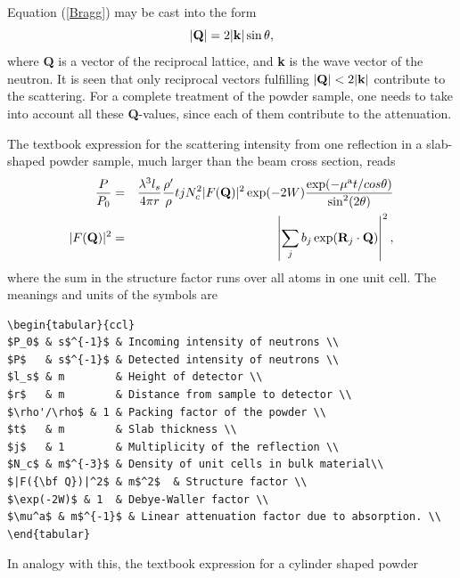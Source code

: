 Equation (\ref{Bragg}) may be cast into the form
\begin{equation}
|{\bf Q}| = 2 |{\bf k}| \sin \theta ,
\end{equation}
where {\bf Q} is a vector of the reciprocal lattice, and {\bf k} is
the wave vector of the neutron. It is seen that only
reciprocal vectors fulfilling $|{\bf Q}| < 2 |{\bf k}|$
contribute to the scattering.
For a complete treatment of the powder sample, one needs to take
into account all these {\bf Q}-values, since each of them contribute
to the attenuation.

The textbook expression for the scattering intensity
from one reflection in a slab-shaped powder sample,
much larger than the beam cross section, reads \cite{bacon}
\begin{eqnarray}
\label{e:slab}
\frac{P}{P_0} &=& \frac{\lambda^3 l_s}{4\pi r} \frac{\rho'}{\rho}
         t j N_c^2 |F({\bf Q})|^2 \exp(-2W)
         \frac{\exp(-\mu^{\rm a} t / cos \theta)}{\sin^2(2\theta)} \\
|F({\bf Q})|^2 &=&
 \left| \sum_j b_j \exp({\bf R}_j \cdot {\bf Q}) \right|^2 ,
\end{eqnarray}
where the sum in the structure factor runs over all atoms in one unit cell.
The meanings and units of the symbols are
%
\begin{lstlisting}\begin{tabular}{ccl}
$P_0$ & s$^{-1}$ & Incoming intensity of neutrons \\
$P$   & s$^{-1}$ & Detected intensity of neutrons \\
$l_s$ & m        & Height of detector \\
$r$   & m        & Distance from sample to detector \\
$\rho'/\rho$ & 1 & Packing factor of the powder \\
$t$   & m        & Slab thickness \\
$j$   & 1        & Multiplicity of the reflection \\
$N_c$ & m$^{-3}$ & Density of unit cells in bulk material\\
$|F({\bf Q})|^2$ & m$^2$  & Structure factor \\
$\exp(-2W)$ & 1  & Debye-Waller factor \\
$\mu^a$ & m$^{-1}$ & Linear attenuation factor due to absorption. \\
\end{tabular}\end{lstlisting}
%
In analogy with this, the textbook expression for a cylinder shaped powder

